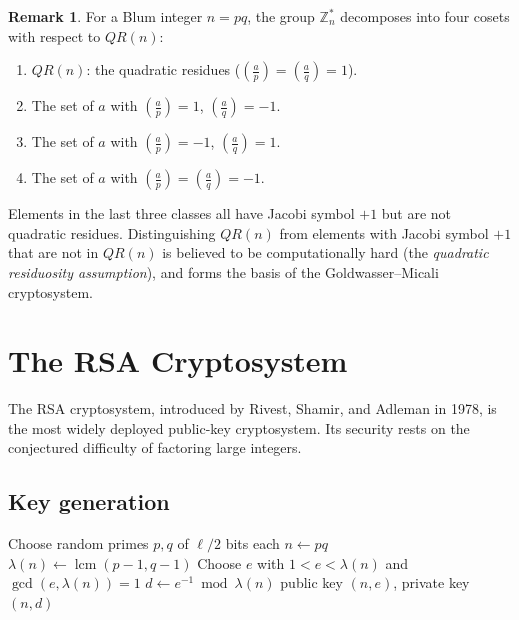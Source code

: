 \documentclass[twoside,12pt]{book}
\theoremstyle{plain}
\theoremstyle{definition}
\newtheorem{remark}[theorem]{Remark}
\theoremstyle{remark}
\begin{document}
\begin{remark}
For a Blum integer $n = pq$, the group $\mathbb{Z}_n^*$ decomposes into four cosets with respect to $QR(n)$:
\begin{enumerate}[nosep]
    \item $QR(n)$: the quadratic residues ($\left(\frac{a}{p}\right) = \left(\frac{a}{q}\right) = 1$).
    \item The set of $a$ with $\left(\frac{a}{p}\right) = 1$, $\left(\frac{a}{q}\right) = -1$.
    \item The set of $a$ with $\left(\frac{a}{p}\right) = -1$, $\left(\frac{a}{q}\right) = 1$.
    \item The set of $a$ with $\left(\frac{a}{p}\right) = \left(\frac{a}{q}\right) = -1$.
\end{enumerate}
Elements in the last three classes all have Jacobi symbol $+1$ but are not quadratic residues. Distinguishing $QR(n)$ from elements with Jacobi symbol $+1$ that are not in $QR(n)$ is believed to be computationally hard (the \emph{quadratic residuosity assumption}), and forms the basis of the Goldwasser--Micali cryptosystem.
\end{remark}

\section{The RSA Cryptosystem}
\label{sec:rsa}

The RSA cryptosystem, introduced by Rivest, Shamir, and Adleman in 1978, is the most widely deployed public-key cryptosystem. Its security rests on the conjectured difficulty of factoring large integers.

\subsection{Key generation}

\begin{algorithm}
\caption{RSA Key Generation}
\label{alg:rsa-keygen}
\begin{algorithmic}[1]
 
    \State Choose random primes $p, q$ of $\ell/2$ bits each
    \State $n \gets pq$ 
    \State $\lambda(n) \gets \operatorname{lcm}(p-1, q-1)$
    \State Choose $e$ with $1 < e < \lambda(n)$ and $\gcd(e, \lambda(n)) = 1$
    \State $d \gets e^{-1} \bmod \lambda(n)$ 
    \State \Return public key $(n, e)$, private key $(n, d)$
\EndFunction
\end{algorithmic}
\end{algorithm}
\end{document}
